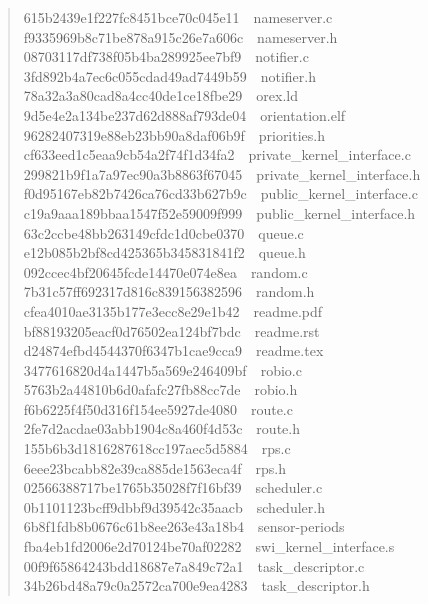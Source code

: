 \documentclass[letterpaper]{article}
\begin{document}
\begin{quote}
{615b2439e1f227fc8451bce70c045e11~~nameserver.c\\
f9335969b8c71be878a915c26e7a606c~~nameserver.h\\
08703117df738f05b4ba289925ee7bf9~~notifier.c\\
3fd892b4a7ec6c055cdad49ad7449b59~~notifier.h\\
78a32a3a80cad8a4cc40de1ce18fbe29~~orex.ld\\
9d5e4e2a134be237d62d888af793de04~~orientation.elf\\
96282407319e88eb23bb90a8daf06b9f~~priorities.h\\
cf633eed1c5eaa9cb54a2f74f1d34fa2~~private\_kernel\_interface.c\\
299821b9f1a7a97ec90a3b8863f67045~~private\_kernel\_interface.h\\
f0d95167eb82b7426ca76cd33b627b9c~~public\_kernel\_interface.c\\
c19a9aaa189bbaa1547f52e59009f999~~public\_kernel\_interface.h\\
63c2ccbe48bb263149cfdc1d0cbe0370~~queue.c\\
e12b085b2bf8cd425365b345831841f2~~queue.h\\
092ccec4bf20645fcde14470e074e8ea~~random.c\\
7b31c57ff692317d816c839156382596~~random.h\\
cfea4010ae3135b177e3ecc8e29e1b42~~readme.pdf\\
bf88193205eacf0d76502ea124bf7bdc~~readme.rst\\
d24874efbd4544370f6347b1cae9cca9~~readme.tex\\
3477616820d4a1447b5a569e246409bf~~robio.c\\
5763b2a44810b6d0afafc27fb88cc7de~~robio.h\\
f6b6225f4f50d316f154ee5927de4080~~route.c\\
2fe7d2acdae03abb1904c8a460f4d53c~~route.h\\
155b6b3d1816287618cc197aec5d5884~~rps.c\\
6eee23bcabb82e39ca885de1563eca4f~~rps.h\\
02566388717be1765b35028f7f16bf39~~scheduler.c\\
0b1101123bcff9dbbf9d39542c35aacb~~scheduler.h\\
6b8f1fdb8b0676c61b8ee263e43a18b4~~sensor-periods\\
fba4eb1fd2006e2d70124be70af02282~~swi\_kernel\_interface.s\\
00f9f65864243bdd18687e7a849c72a1~~task\_descriptor.c\\
34b26bd48a79c0a2572ca700e9ea4283~~task\_descriptor.h\\
}
\end{quote}
\end{document}
